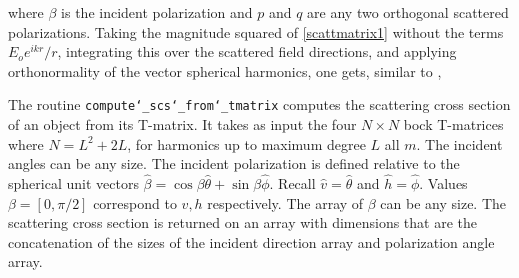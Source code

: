 \noindent where $\beta$ is the incident polarization and $p$ and $q$ are any two orthogonal scattered polarizations. Taking the magnitude squared of \eqref{scattmatrix1} without the terms $E_o e^{ikr}/r $, integrating this over the scattered field directions, and applying orthonormality of the vector spherical harmonics, one gets, similar to \cite{tsang1985theory},


The routine \texttt{compute\char`_scs\char`_from\char`_tmatrix} computes the scattering cross section of an object from its T-matrix. It takes as input the four $N \times N$ bock T-matrices where $N = L^2 + 2L$, for harmonics up to maximum degree $L$ all $m$.  The incident angles can be any size. The incident polarization is defined relative to the spherical unit vectors $\hat{\beta} = \cos \beta \hat{\theta} + \sin\beta \hat{\phi}$.  Recall $\hat{v} =\hat{\theta}$ and $\hat{h} =\hat{\phi}$. Values $\beta = [0,\pi/2]$ correspond to $v, h$ respectively. The array of $\beta$ can be any size. The scattering cross section is returned on an array with dimensions that are the concatenation of the sizes of the incident direction array and polarization angle array.  


{\footnotesize
{}
}

%

%
%
%


